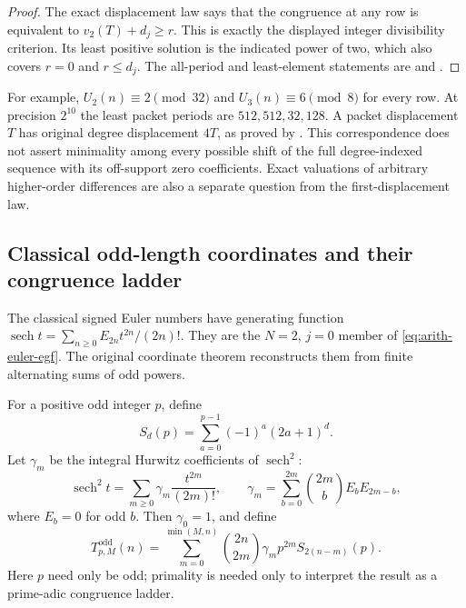 \begin{proof}
The exact displacement law says that the congruence at any row is
 equivalent to $v_2(T)+d_j\ge r$.  This is exactly the displayed integer
divisibility criterion.  Its least positive solution is the indicated
power of two, which also covers $r=0$ and $r\le d_j$.
The all-period and least-element statements are
 and
.
\end{proof}

For example, $U_2(n)\equiv2\pmod{32}$ and $U_3(n)\equiv6\pmod8$
for every row.  At precision $2^{10}$ the least packet periods are
$512,512,32,128$.  A packet displacement $T$ has original degree
displacement $4T$, as proved by
.
This correspondence does not assert minimality among every possible
shift of the full degree-indexed sequence with its off-support zero
coefficients.  Exact valuations of arbitrary higher-order differences
are also a separate question from the first-displacement law.

\subsection{Classical odd-length coordinates and their congruence ladder}

The classical signed Euler numbers have generating function
$\operatorname{sech}t=\sum_{n\ge0}E_{2n}t^{2n}/(2n)!$.
They are the $N=2$, $j=0$ member of
\eqref{eq:arith-euler-egf}.  The original coordinate theorem reconstructs
them from finite alternating sums of odd powers.

\begin{definition}
\label{def:arith-odd-source}
For a positive odd integer $p$, define
\[
 S_d(p)=\sum_{a=0}^{p-1}(-1)^a(2a+1)^d.
\]
Let $\gamma_m$ be the integral Hurwitz coefficients of $\operatorname{sech}^2$:
\[
 \operatorname{sech}^2t=\sum_{m\ge0}\gamma_m\frac{t^{2m}}{(2m)!},
 \qquad
 \gamma_m=\sum_{b=0}^{2m}\binom{2m}{b}E_bE_{2m-b},
\]
where $E_b=0$ for odd $b$.  Then $\gamma_0=1$, and define
\[
 T^{\mathrm{odd}}_{p,M}(n)=\sum_{m=0}^{\min(M,n)}
       \binom{2n}{2m}\gamma_m p^{2m}S_{2(n-m)}(p).
\]
Here $p$ need only be odd; primality is needed only to interpret the
result as a prime-adic congruence ladder.
\end{definition}

